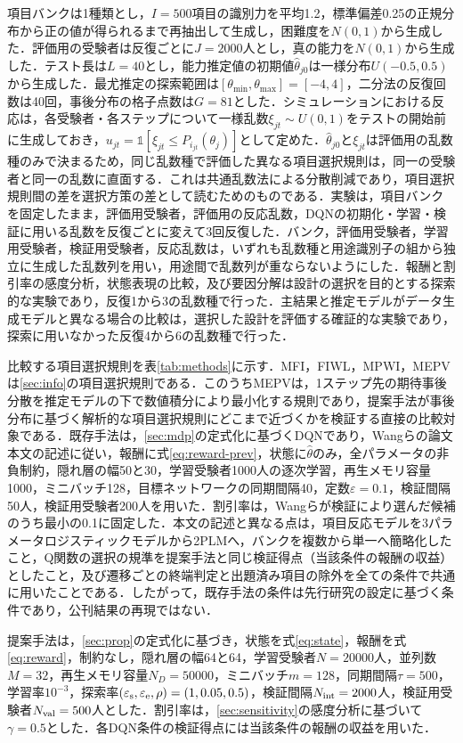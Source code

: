 \documentclass[paper]{ieicej}
\begin{document}
項目バンクは1種類とし，$I=500$項目の識別力を平均1.2，標準偏差0.25の正規分布から正の値が得られるまで再抽出して生成し，困難度を$N(0,1)$から生成した．評価用の受験者は反復ごとに$J=2000$人とし，真の能力を$N(0,1)$から生成した．テスト長は$L=40$とし，能力推定値の初期値$\hat\theta_{j0}$は一様分布$U(-0.5,0.5)$から生成した．最尤推定の探索範囲は$[\theta_{\min},\theta_{\max}]=[-4,4]$，二分法の反復回数は40回，事後分布の格子点数は$G=81$とした．シミュレーションにおける反応は，各受験者・各ステップについて一様乱数$\xi_{jt}\sim U(0,1)$をテストの開始前に生成しておき，$u_{jt}=\mathbb{1}[\xi_{jt}\le P_{i_{jt}}(\theta_j)]$として定めた．$\hat\theta_{j0}$と$\xi_{jt}$は評価用の乱数種のみで決まるため，同じ乱数種で評価した異なる項目選択規則は，同一の受験者と同一の乱数に直面する．これは共通乱数法による分散削減であり，項目選択規則間の差を選択方策の差として読むためのものである．実験は，項目バンクを固定したまま，評価用受験者，評価用の反応乱数，DQNの初期化・学習・検証に用いる乱数を反復ごとに変えて3回反復した．バンク，評価用受験者，学習用受験者，検証用受験者，反応乱数は，いずれも乱数種と用途識別子の組から独立に生成した乱数列を用い，用途間で乱数列が重ならないようにした．報酬と割引率の感度分析，状態表現の比較，及び要因分解は設計の選択を目的とする探索的な実験であり，反復1から3の乱数種で行った．主結果と推定モデルがデータ生成モデルと異なる場合の比較は，選択した設計を評価する確証的な実験であり，探索に用いなかった反復4から6の乱数種で行った．

比較する項目選択規則を表\ref{tab:methods}に示す．MFI，FIWL，MPWI，MEPVは\ref{sec:info}の項目選択規則である．このうちMEPVは，1ステップ先の期待事後分散を推定モデルの下で数値積分により最小化する規則であり，提案手法が事後分布に基づく解析的な項目選択規則にどこまで近づくかを検証する直接の比較対象である．既存手法は，\ref{sec:mdp}の定式化に基づくDQNであり，Wangらの論文本文の記述に従い，報酬に式\eqref{eq:reward-prev}，状態に$\hat\theta$のみ，全パラメータの非負制約，隠れ層の幅50と30，学習受験者1000人の逐次学習，再生メモリ容量1000，ミニバッチ128，目標ネットワークの同期間隔40，定数$\varepsilon=0.1$，検証間隔50人，検証用受験者200人を用いた．割引率は，Wangらが検証により選んだ候補のうち最小の0.1に固定した．本文の記述と異なる点は，項目反応モデルを3パラメータロジスティックモデルから2PLMへ，バンクを複数から単一へ簡略化したこと，Q関数の選択の規準を提案手法と同じ検証得点（当該条件の報酬の収益）としたこと，及び遷移ごとの終端判定と出題済み項目の除外を全ての条件で共通に用いたことである．したがって，既存手法の条件は先行研究の設定に基づく条件であり，公刊結果の再現ではない．

提案手法は，\ref{sec:prop}の定式化に基づき，状態を式\eqref{eq:state}，報酬を式\eqref{eq:reward}，制約なし，隠れ層の幅64と64，学習受験者$N=20000$人，並列数$M=32$，再生メモリ容量$N_D=50000$，ミニバッチ$m=128$，同期間隔$\tau=500$，学習率$10^{-3}$，探索率$(\varepsilon_{\rm s},\varepsilon_{\rm e},\rho)=(1,0.05,0.5)$，検証間隔$N_{\rm int}=2000$人，検証用受験者$N_{\rm val}=500$人とした．割引率は，\ref{sec:sensitivity}の感度分析に基づいて$\gamma=0.5$とした．各DQN条件の検証得点には当該条件の報酬の収益を用いた．
\end{document}

